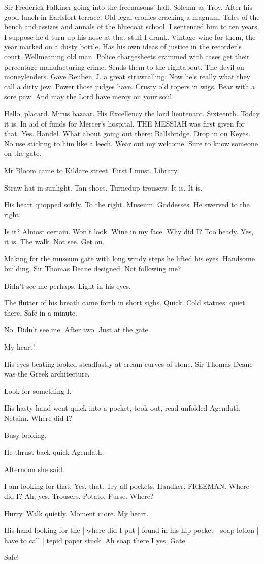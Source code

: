 Sir Frederick Falkiner going into the freemasons' hall.
Solemn as Troy.
After his good lunch in Earlsfort terrace.
Old legal cronies cracking a magnum.
Tales of the bench and assizes and annals of the bluecoat school.
I sentenced him to ten years.
I suppose he'd turn up his nose at that stuff I drank.
Vintage wine for them,
the year marked on a dusty bottle.
Has his own ideas of justice in the recorder's court.
Wellmeaning old man.
Police chargesheets crammed with cases get their percentage manufacturing crime.
Sends them to the rightabout.
The devil on moneylenders.
Gave Reuben~J. a great strawcalling.
Now he's really what they call a dirty jew.
Power those judges have.
Crusty old topers in wigs.
Bear with a sore paw.
And may the Lord have mercy on your soul.

Hello, placard.
Mirus bazaar.
His Excellency the lord lieutenant.
Sixteenth.
Today it is.
In aid of funds for Mercer's hospital.
THE MESSIAH was first given for that.
Yes.
Handel.
What about going out there:
Ballsbridge.
Drop in on Keyes.
No use sticking to him like a leech.
Wear out my welcome.
Sure to know someone on the gate.

Mr Bloom came to Kildare street.
First I must.
Library.

Straw hat in sunlight.
Tan shoes.
Turnedup trousers.
It is.
It is.

His heart quopped softly.
To the right.
Museum.
Goddesses.
He swerved to the right.

Is it?
Almost certain.
Won't look.
Wine in my face.
Why did I?
Too heady.
Yes,
it is.
The walk.
Not see.
Get on.

Making for the museum gate with long windy steps he lifted his eyes.
Handsome building.
Sir Thomas Deane designed.
Not following me?

Didn't see me perhaps.
Light in his eyes.

The flutter of his breath came forth in short sighs.
Quick.
Cold statues:
quiet there.
Safe in a minute.

No.
Didn't see me.
After two.
Just at the gate.

My heart!

His eyes beating looked steadfastly at cream curves of stone.
Sir Thomas
Deane was the Greek architecture.

Look for something I.

His hasty hand went quick into a pocket,
took out,
read unfolded Agendath Netaim.
Where did I?

Busy looking.

He thrust back quick Agendath.

Afternoon she said.

I am looking for that.
Yes, that.
Try all pockets.
Handker.
FREEMAN.
Where did I?
Ah, yes.
Trousers.
Potato.
Purse.
Where?

Hurry.
Walk quietly.
Moment more.
My heart.

His hand looking for the |
where did I put |
found in his hip pocket |
soap lotion |
have to call |
tepid paper stuck.
Ah soap there I yes.
Gate.

Safe!


